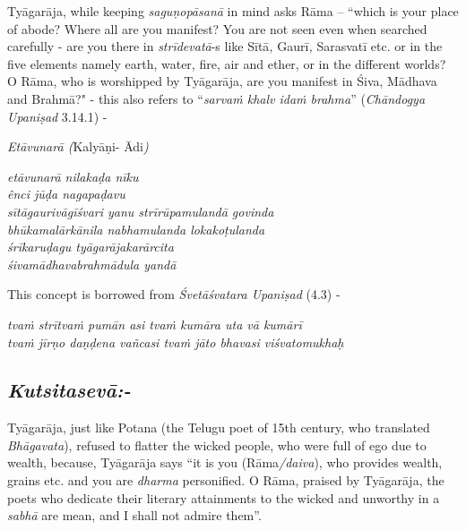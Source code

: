 Tyāgarāja, while keeping \textit{saguṇopāsanā} in mind asks Rāma – ``which is your place of abode? Where all are you manifest? You are not seen even when searched carefully - are you there in \textit{strīdevatā}-s like Sītā\textit{,} Gaurī\textit{,} Sarasvatī etc. or in the five elements namely earth, water, fire, air and ether, or in the different worlds? O Rāma, who is worshipped by Tyāgarāja, are you manifest in Śiva, Mādhava and Brahmā?" - this also refers to “\textit{sarvaṁ khalv idaṁ brahma}” (\textit{Chāndogya Upaniṣad} 3.14.1) - 

\textit{Etāvunarā (}Kalyāṇi- Ādi\textit{)}

\begin{centerquote}
\textit{etāvunarā nilakaḍa nīku}\\ \textit{ênci jūḍa nagapaḍavu}\\ \textit{sītāgaurivāgīśvari yanu strīrūpamulandā govinda}\\ \textit{bhūkamalārkānila nabhamulanda lokakoṭulanda}\\ \textit{śrīkaruḍagu tyāgarājakarārcita}\\ \textit{śivamādhavabrahmādula yandā}
\end{centerquote}

This concept is borrowed from \textit{Śvetāśvatara Upaniṣad} (4.3) -

\begin{myquote}
\textit{tvaṁ strītvaṁ pumān asi tvaṁ kumāra uta vā kumārī }\\ \textit{tvaṁ jīrṇo daṇḍena vañcasi tvaṁ jāto bhavasi viśvatomukhaḥ} 
\end{myquote}


\subsection*{\textit{Kutsitasevā:-}}

Tyāgarāja, just like Potana (the Telugu poet of 15th century, who translated \textit{Bhāgavata}), refused to flatter the wicked people, who were full of ego due to wealth, because, Tyāgarāja says “it is you (Rāma\textit{/daiva}), who provides wealth, grains etc. and you are \textit{dharma} personified. O Rāma, praised by Tyāgarāja, the poets who dedicate their literary attainments to the wicked and unworthy in a \textit{sabhā} are mean, and I shall not admire them”. 

